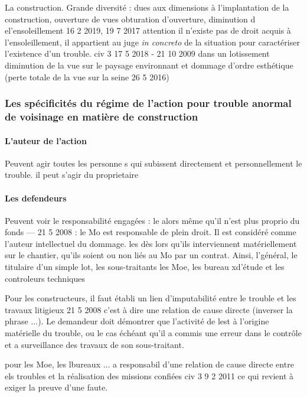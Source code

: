 					La construction. Grande diversité : dues aux dimensions à l'implantation de la construction, ouverture de vues obturation d'ouverture, diminution d el'ensoleillement 16 2 2019, 19 7 2017 attention il n'existe pas de droit acquis à l'ensoleillement, il appartient au juge \emph{in concreto} de la situation pour caractériser l'existence d'un trouble. civ 3 17 5 2018 -  21 10 2009 dans un lotissement
					diminution de la vue sur le paysage environnant et dommage d'ordre esthétique (perte totale de la vue sur la seine 26 5 2016)

		\subsubsection{Les spécificités du régime de l'action pour trouble anormal de voisinage en matière de construction}

			\paragraph{L'auteur de l'action} Peuvent agir toutes les personne s qui subissent directement et personnellement le trouble. il peut s'agir du proprietaire

			\paragraph{Les defendeurs} Peuvent voir le responsabilité engagées :
				le \Mo alors même qu'il n'est plus proprio du fonds --- 21 5 2008 : le Mo est responsable de plein droit. Il est considéré comme l'auteur intellectuel du dommage.
				les \E dès lors qu'ils interviennent matériellement sur le chantier, qu'ils soient ou non liés au Mo par un contrat. Ainsi, l'\E général, le titulaire d'un simple lot, les sous-traitants
				les Moe, les bureau xd'étude et les controleurs techniques

			Pour les constructeurs, il faut établi un lien d'imputabilité entre le trouble et les travaux litigieux 21 5 2008 c'est à dire une relation de cause directe (inverser la phrase ...). Le demandeur doit démontrer que l'activité de l\E est à l'origine matérielle du trouble, ou le cas échéant qu'il a commis une erreur dans le contrôle et a surveillance des travaux de son sous-traitant.

			pour les Moe, les lbureaux ... a responsabil d'une relation de cause directe entre els troubles et la réalisation des missions confiées civ 3 9 2 2011 ce qui revient à exiger la preuve d'une faute.

